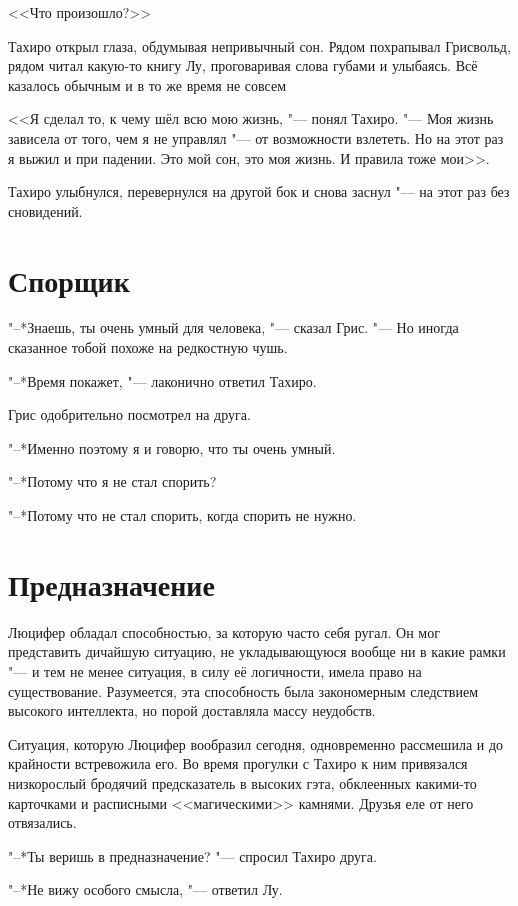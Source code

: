 <<Что произошло?>>

Тахиро открыл глаза, обдумывая непривычный сон.
Рядом похрапывал Грисвольд, рядом читал какую-то книгу Лу, проговаривая слова губами и улыбаясь.
Всё казалось обычным и в то же время не совсем\ldotst

<<Я сделал то, к чему шёл всю мою жизнь, "--- понял Тахиро.
"--- Моя жизнь зависела от того, чем я не управлял "--- от возможности взлететь.
Но на этот раз я выжил и при падении.
Это мой сон, это моя жизнь.
И правила тоже мои>>.

Тахиро улыбнулся, перевернулся на другой бок и снова заснул "--- на этот раз без сновидений.

\section{Спорщик}

"--*Знаешь, ты очень умный для человека, "--- сказал Грис.
"--- Но иногда сказанное тобой похоже на редкостную чушь.

"--*Время покажет, "--- лаконично ответил Тахиро.

Грис одобрительно посмотрел на друга.

"--*Именно поэтому я и говорю, что ты очень умный.

"--*Потому что я не стал спорить?

"--*Потому что не стал спорить, когда спорить не нужно.

\section{Предназначение}

Люцифер обладал способностью, за которую часто себя ругал.
Он мог представить дичайшую ситуацию, не укладывающуюся вообще ни в какие рамки "--- и тем не менее ситуация, в силу её логичности, имела право на существование.
Разумеется, эта способность была закономерным следствием высокого интеллекта, но порой доставляла массу неудобств.

Ситуация, которую Люцифер вообразил сегодня, одновременно рассмешила и до крайности встревожила его.
Во время прогулки с Тахиро к ним привязался низкорослый бродячий предсказатель в высоких гэта, обклеенных какими-то карточками и расписными <<магическими>> камнями.
Друзья еле от него отвязались.

"--*Ты веришь в предназначение? "--- спросил Тахиро друга.

"--*Не вижу особого смысла, "--- ответил Лу.

